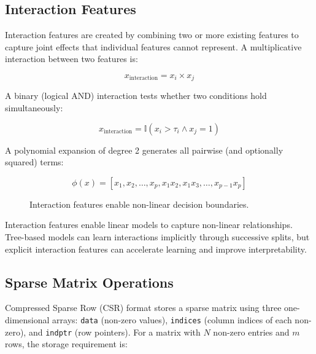 \documentclass[10pt,a4paper]{article}
\begin{document}
\subsection{Interaction Features}
\label{sec:interaction-features}

Interaction features are created by combining two or more existing features to capture joint effects that individual features cannot represent. A multiplicative interaction between two features is:

\begin{equation}
x_{\text{interaction}} = x_i \times x_j
\label{eq:interaction-mult}
\end{equation}

A binary (logical AND) interaction tests whether two conditions hold simultaneously:

\begin{equation}
x_{\text{interaction}} = \mathbb{I}(x_i > \tau_i \land x_j = 1)
\label{eq:interaction-binary}
\end{equation}

A polynomial expansion of degree 2 generates all pairwise (and optionally squared) terms:

\begin{equation}
\phi(x) = [x_1, x_2, \ldots, x_p, x_1x_2, x_1x_3, \ldots, x_{p-1}x_p]
\label{eq:polynomial}
\end{equation}

\begin{figure}[H]
    \centering
    \caption{Interaction features enable non-linear decision boundaries.}
    \label{fig:interaction-features}
\end{figure}

Interaction features enable linear models to capture non-linear relationships. Tree-based models can learn interactions implicitly through successive splits, but explicit interaction features can accelerate learning and improve interpretability.

\subsection{Sparse Matrix Operations}
\label{sec:sparse-matrices}

Compressed Sparse Row (CSR) format stores a sparse matrix using three one-dimensional arrays: \texttt{data} (non-zero values), \texttt{indices} (column indices of each non-zero), and \texttt{indptr} (row pointers). For a matrix with $N$ non-zero entries and $m$ rows, the storage requirement is:
\end{document}
